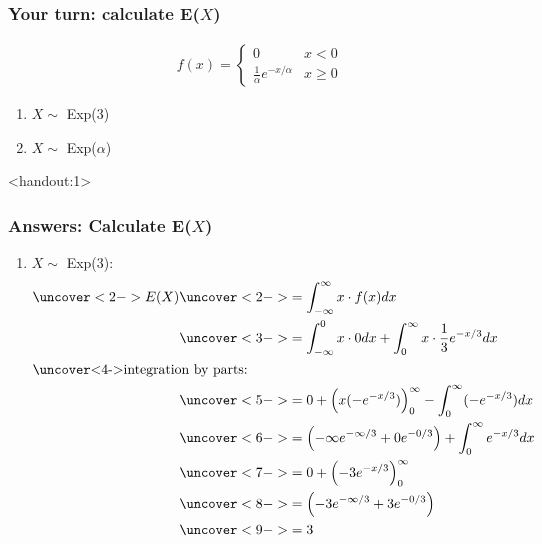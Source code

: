 \documentclass[handout]{beamer}\usepackage[]{graphicx}\usepackage[]{color}
\newcommand{\answers}{1}
\numberwithin{equation}{section}
\begin{document}
\begin{frame}
\frametitle{Your turn: calculate E($X$)}

\begin{align*}
f(x) = \begin{cases}
0 & x < 0 \\
\frac{1}{\alpha} e^{-x/\alpha} & x \ge 0
\end{cases}
\end{align*}

\begin{enumerate}[1. ]
\item $X \sim $ Exp(3)
\item $X \sim $ Exp($\alpha$)
\end{enumerate}
\end{frame}


\begin{frame}<handout:\answers>
\frametitle{Answers: Calculate E($X$)} \scriptsize

\begin{enumerate}[1. ]

\item $X \sim $ Exp(3):
\begin{align*}
\uncover<2->{E(X)} & \uncover<2->{= \int_{-\infty}^\infty x \cdot f(x) dx} \\
&\uncover<3->{= \int_{-\infty}^0 x \cdot 0 dx + \int_{0}^\infty x \cdot \frac{1}{3} e^{-x/3} dx} \\
\intertext{\uncover<4->{integration by parts:}}
&\uncover<5->{=0 + \left (  x (-e^{-x/3})  \right)_{0}^\infty - \int_{0}^\infty (-e^{-x/3}) dx} \\
&\uncover<6->{= \left ( -\infty e^{-\infty/3} + 0 e^{-0/3} \right ) + \int_0^\infty e^{-x/3} dx} \\
&\uncover<7->{= 0 + \left ( -3e^{-x/3} \right )_0^{\infty}} \\
&\uncover<8->{= \left (-3 e^{-\infty/3} + 3 e^{-0/3} \right )} \\
&\uncover<9->{= 3}
\end{align*}
\end{enumerate}
\end{frame}
\end{document}
